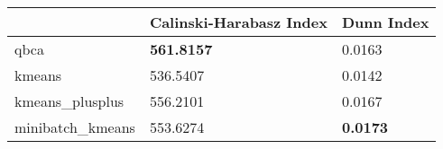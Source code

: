 \begin{table}[htbp]
\centering
\begin{tabular}{lll}
\toprule
 & Calinski-Harabasz Index & Dunn Index \\
\midrule
qbca & \textbf{561.8157} & 0.0163 \\
kmeans & 536.5407 & 0.0142 \\
kmeans_plusplus & 556.2101 & 0.0167 \\
minibatch_kmeans & 553.6274 & \textbf{0.0173} \\
\bottomrule
\end{tabular}
\end{table}
